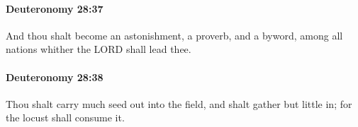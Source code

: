 		\paragraph{Deuteronomy 28:37} %
			\label{DEUTERONOMY-28-37}

			And thou shalt become an astonishment, a proverb, and a byword, among all nations whither the LORD shall lead thee.


		\paragraph{Deuteronomy 28:38} %
			\label{DEUTERONOMY-28-38}

			Thou shalt carry much seed out into the field, and shalt gather but little in; for the locust shall consume it.


